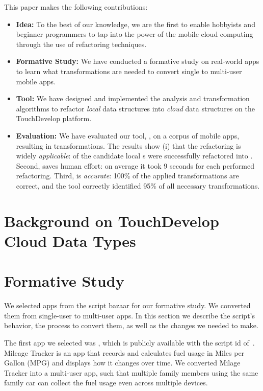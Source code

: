 \documentclass{sigplanconf}
\begin{document}
This paper makes the following contributions:
\begin{itemize}
\item{\textbf{Idea:}} To the best of our knowledge, we are the first to enable hobbyists and beginner programmers to tap into the power of the mobile cloud
computing through the use of refactoring techniques.

\item{\textbf{Formative Study:}} We have conducted a formative study on \numFormative real-world apps to learn what transformations are needed to convert single to multi-user mobile apps. 

\item{\textbf{Tool:}} We have designed and implemented the analysis and transformation algorithms to refactor \emph{local} data structures into \emph{cloud} data structures on the TouchDevelop platform. 

\item{\textbf{Evaluation:}} We have evaluated our tool, \tool, on a corpus of \numScripts mobile apps, resulting in \numTransformations transformations. The results show (i) that the refactoring is widely \emph{applicable}: \percentRefactored of the candidate local s were successfully refactored into . Second, \tool saves human effort: on average it took 9 seconds for each performed refactoring. Third, \tool is  
\emph{accurate}: 100\% of the applied transformations are correct, and the tool correctly identified 95\% of all necessary transformations.  
\end{itemize}

\section{Background on TouchDevelop Cloud Data Types}


\section{Formative Study}
\label{sec:Formative}

We selected \numFormative apps from the \TD script bazaar for our formative study. We converted them from single-user to multi-user apps. In this section we describe the script's behavior, the process to convert them, as well as the changes we needed to make.

The first app we selected was \MT, which is publicly available with the script id of~\cite{MileageTracker}.  Mileage Tracker is an app that records and calculates fuel usage in Miles per Gallon (MPG) and displays how it changes over time. We converted Milage Tracker into a multi-user app, such that multiple family members using the same family car can collect the fuel usage even across multiple devices.
\end{document}
